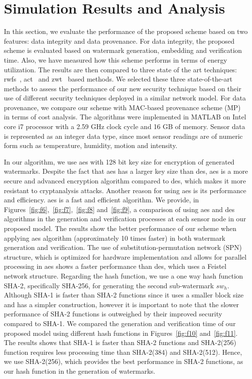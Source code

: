 \documentclass{llncs}
\begin{document}
\section{Simulation Results and Analysis}
\label{sec:results}
In this section, we evaluate the performance of the proposed scheme based on two features: data integrity and data provenance. For data integrity, the proposed scheme is evaluated based on watermark generation, embedding and verification time. Also, we have measured how this scheme performs in terms of energy utilization. The results are then compared to three state of the art techniques: \gls*{rwfs}~\cite{Alromith2018}, \gls*{act}~\cite{Sun2013} and \gls*{zwt}~\cite{hameed2018} based methods. We selected these three state-of-the-art methods to assess the performance of our new security technique based on their use of different security techniques deployed in a similar network model. For data provenance, we compare our scheme with MAC-based provenance scheme (MP) in terms of cost analysis. The algorithms were implemented in MATLAB\textsuperscript{\texttrademark} on Intel core i7 processor with a 2.59 GHz clock cycle and 16 GB of memory. Sensor data is represented as an integer data type, since most sensor readings are of numeric form such as temperature, humidity, motion and intensity. \par
In our algorithm, we use \gls*{aes} with 128 bit key size for encryption of generated watermarks. Despite the fact that \gls*{aes} has a larger key size than \gls*{des}, \gls*{aes} is a more secure and advanced encryption algorithm compared to \gls*{des}, which makes it more resistant to cryptanalysis attacks. Another reason for using \gls*{aes} is its performance and efficiency. \gls*{aes} is a fast and efficient algorithm. We provide, in Figures~\ref{fig:f6},~\ref{fig:f7},~\ref{fig:f8} and~\ref{fig:f9}, a comparison of using \gls*{aes} and \gls*{des} algorithms in the generation and verification processes at each sensor node in our proposed model. The results show the better performance of our scheme when applying \gls*{aes} algorithm (approximately 10 times faster) in both watermark generation and verification. The use of substitution-permutation network (SPN) structure, which is optimized for hardware implementation and allows for parallel processing in \gls*{aes} shows a faster performance than \gls*{des}, which uses a Feistel network structure. Regarding the hash function, we use a one way hash function SHA-2, specifically SHA-256, for generating the second sub-watermark $sw_h$. Although SHA-1 is faster than SHA-2 functions since it uses a smaller block size and has a simpler construction, however it is important to note that the slower performance of SHA-2 functions is outweighed by their improved security compared to SHA-1. We compared the generation and verification time of our proposed model using different hash functions in Figures~\ref{fig:f10} and~\ref{fig:f11}. The results shows that SHA-1 is faster than SHA-2 functions and SHA-2(256) function requires less processing time than SHA-2(384) and SHA-2(512). Hence, we use SHA-2(256), which provides the best performance in SHA-2 functions, as our hash function in the generation of watermarks. 
\end{document}
